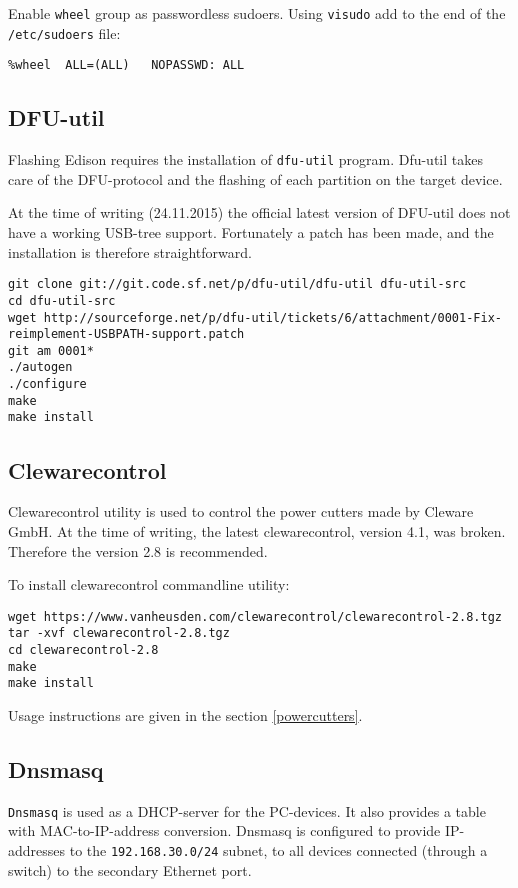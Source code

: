 \documentclass[a4paper,11pt]{article}
\newcommand{\cmd}[1]{\texttt{#1}}
\begin{document}
Enable \cmd{wheel} group as passwordless sudoers. Using \cmd{visudo} add to the end of the \cmd{/etc/sudoers} file:
\begin{lstlisting}
%wheel	ALL=(ALL)	NOPASSWD: ALL
\end{lstlisting}

\subsection*{DFU-util}
\label{dfuutil}

Flashing Edison requires the installation of \cmd{dfu-util} program. Dfu-util takes care of the DFU-protocol and the flashing of each partition on the target device.

At the time of writing (24.11.2015) the official latest version of DFU-util does not have a working USB-tree support. Fortunately a patch has been made, and the installation is therefore straightforward.

\begin{lstlisting}
git clone git://git.code.sf.net/p/dfu-util/dfu-util dfu-util-src
cd dfu-util-src
wget http://sourceforge.net/p/dfu-util/tickets/6/attachment/0001-Fix-reimplement-USBPATH-support.patch
git am 0001*
./autogen
./configure
make
make install
\end{lstlisting}

\subsection*{Clewarecontrol}
Clewarecontrol utility is used to control the power cutters made by Cleware GmbH. At the time of writing, the latest clewarecontrol, version 4.1, was broken. Therefore the version 2.8 is recommended.

To install clewarecontrol commandline utility:
\begin{lstlisting}
wget https://www.vanheusden.com/clewarecontrol/clewarecontrol-2.8.tgz
tar -xvf clewarecontrol-2.8.tgz
cd clewarecontrol-2.8
make
make install
\end{lstlisting}

Usage instructions are given in the section \ref{powercutters}.

\subsection*{Dnsmasq}
\cmd{Dnsmasq} is used as a DHCP-server for the PC-devices. It also provides a table with MAC-to-IP-address conversion. Dnsmasq is configured to provide IP-addresses to the \cmd{192.168.30.0/24} subnet, to all devices connected (through a switch) to the secondary Ethernet port.
\end{document}
